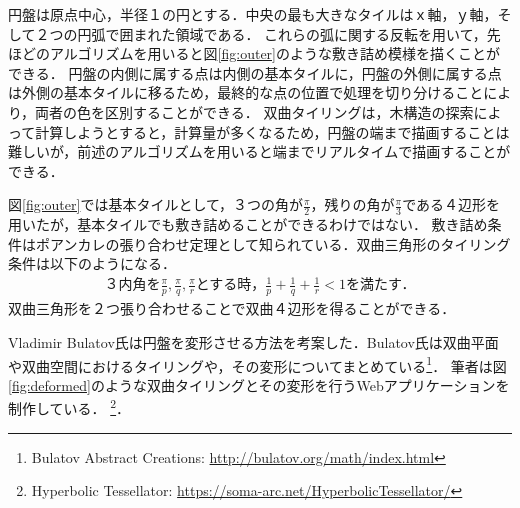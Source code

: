 円盤は原点中心，半径１の円とする．中央の最も大きなタイルはｘ軸，ｙ軸，そして２つの円弧で囲まれた領域である．
これらの弧に関する反転を用いて，先ほどのアルゴリズムを用いると図\ref{fig:outer}のような敷き詰め模様を描くことができる．
円盤の内側に属する点は内側の基本タイルに，円盤の外側に属する点は外側の基本タイルに移るため，最終的な点の位置で処理を切り分けることにより，両者の色を区別することができる．
双曲タイリングは，木構造の探索によって計算しようとすると，計算量が多くなるため，円盤の端まで描画することは難しいが，前述のアルゴリズムを用いると端までリアルタイムで描画することができる．

図\ref{fig:outer}では基本タイルとして，３つの角が$\frac{\pi}{2}$，残りの角が$\frac{\pi}{3}$である４辺形を用いたが，基本タイルでも敷き詰めることができるわけではない．
敷き詰め条件はポアンカレの張り合わせ定理として知られている．双曲三角形のタイリング条件は以下のようになる．
\begin{eqnarray*}
\text{３内角を}\frac{\pi}{p},\frac{\pi}{q},\frac{\pi}{r}\text{とする時，}
 \frac{1}{p} + \frac{1}{q} + \frac{1}{r} < 1 \text{を満たす．}
\end{eqnarray*}
双曲三角形を２つ張り合わせることで双曲４辺形を得ることができる．

Vladimir Bulatov氏は円盤を変形させる方法を考案した\cite{bending}．Bulatov氏は双曲平面や双曲空間におけるタイリングや，その変形についてまとめている\footnote{Bulatov Abstract Creations: \url{http://bulatov.org/math/index.html}}．
筆者は図\ref{fig:deformed}のような双曲タイリングとその変形を行うWebアプリケーションを制作している．
\footnote{Hyperbolic Tessellator: \url{https://soma-arc.net/HyperbolicTessellator/}}．


